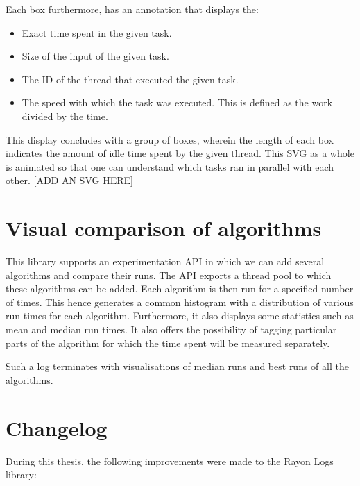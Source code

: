 Each box furthermore, has an annotation that displays the:
\begin{itemize}
\item Exact time spent in the given task.
\item Size of the input of the given task.
\item The ID of the thread that executed the given task.
\item The speed with which the task was executed. This is defined as the work divided by the time.
\end{itemize}

This display concludes with a group of boxes, wherein the length of each box indicates the amount of idle time spent by the given thread. This SVG as a whole is animated so that one can understand which tasks ran in parallel with each other. [ADD AN SVG HERE]

\section{Visual comparison of algorithms}
This library supports an experimentation API in which we can add several algorithms and compare their runs.
The API exports a thread pool to which these algorithms can be added.
Each algorithm is then run for a specified number of times.
This hence generates a common histogram with a distribution of various run times for each algorithm.
Furthermore, it also displays some statistics such as mean and median run times.
It also offers the possibility of tagging particular parts of the algorithm for which the time spent will be measured separately.

Such a log terminates with visualisations of median runs and best runs of all the algorithms.
\clearpage
\section{Changelog}
During this thesis, the following improvements were made to the Rayon Logs library:

